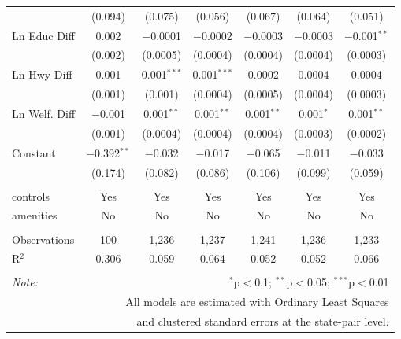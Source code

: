\begin{table}[!htbp]
\begin{tabular}{@{\extracolsep{5pt}}lcccccc}
  & (0.094) & (0.075) & (0.056) & (0.067) & (0.064) & (0.051) \\ 
  Ln Educ Diff & 0.002 & $-$0.0001 & $-$0.0002 & $-$0.0003 & $-$0.0003 & $-$0.001$^{**}$ \\ 
  & (0.002) & (0.0005) & (0.0004) & (0.0004) & (0.0004) & (0.0003) \\ 
  Ln Hwy Diff & 0.001 & 0.001$^{***}$ & 0.001$^{***}$ & 0.0002 & 0.0004 & 0.0004 \\ 
  & (0.001) & (0.001) & (0.0004) & (0.0005) & (0.0004) & (0.0003) \\ 
  Ln Welf. Diff & $-$0.001 & 0.001$^{**}$ & 0.001$^{**}$ & 0.001$^{**}$ & 0.001$^{*}$ & 0.001$^{**}$ \\ 
  & (0.001) & (0.0004) & (0.0004) & (0.0004) & (0.0003) & (0.0002) \\ 
  Constant & $-$0.392$^{**}$ & $-$0.032 & $-$0.017 & $-$0.065 & $-$0.011 & $-$0.033 \\ 
  & (0.174) & (0.082) & (0.086) & (0.106) & (0.099) & (0.059) \\ 
 \hline \\[-1.8ex] 
controls & Yes & Yes & Yes & Yes & Yes & Yes \\ 
amenities & No & No & No & No & No & No \\ 
\hline \\[-1.8ex] 
Observations & 100 & 1,236 & 1,237 & 1,241 & 1,236 & 1,233 \\ 
R$^{2}$ & 0.306 & 0.059 & 0.064 & 0.052 & 0.052 & 0.066 \\ 
\hline 
\hline \\[-1.8ex] 
\textit{Note:}  & \multicolumn{6}{r}{$^{*}$p$<$0.1; $^{**}$p$<$0.05; $^{***}$p$<$0.01} \\ 
 & \multicolumn{6}{r}{All models are estimated with Ordinary Least Squares} \\ 
 & \multicolumn{6}{r}{and clustered standard errors at the state-pair level.} \\ 
\end{tabular} 
\end{table} 
